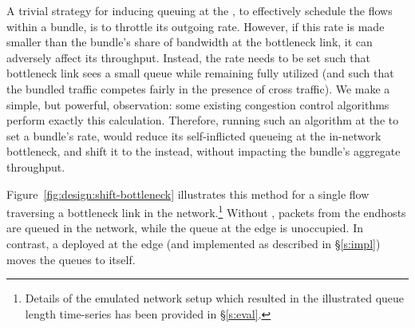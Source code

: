 
A trivial strategy for inducing queuing at the \name, to effectively schedule the flows within a bundle, is to throttle its outgoing rate. However, if this rate is made smaller than the bundle's share of bandwidth at the bottleneck link, it can adversely affect its throughput. Instead, the rate needs to be set such that bottleneck link sees a small queue while remaining fully utilized (and such that the bundled traffic competes fairly in the presence of cross traffic). We make a simple, but powerful, observation: some existing congestion control algorithms~\cite{nimbus, copa} perform exactly this calculation. Therefore, running such an algorithm at the \name to set a bundle's rate, would reduce its self-inflicted queueing at the in-network bottleneck, and shift it to the \name instead, without impacting the bundle's aggregate throughput. 

Figure~\ref{fig:design:shift-bottleneck} illustrates this method for a single flow traversing a bottleneck link in the network.\footnote{Details of the emulated network setup which resulted in the illustrated queue length time-series has been provided in \S\ref{s:eval}.} Without \name, packets from the endhosts are queued in the network, while the queue at the edge is unoccupied. In contrast, a \name deployed at the edge (and implemented as described in \S\ref{s:impl}) moves the queues to itself.

